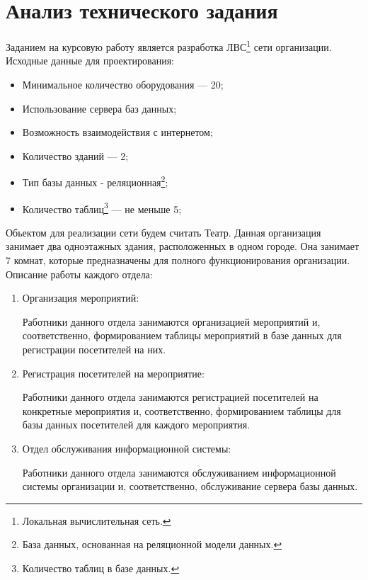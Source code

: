 \documentclass[russian,utf8,pointsection,simple,14pt]{eskdtext}
\begin{document}
\maketitle
\tableofcontents
\newpage
\section{Анализ технического задания}
Заданием на курсовую работу является разработка ЛВС\footnote{Локальная вычислительная сеть.} сети организации.
\medskip
\point Исходные данные для проектирования:
\begin{itemize}
\item Минимальное количество оборудования --- 20;
\item Использование сервера баз данных;
\item Возможность взаимодействия с интернетом;
\item Количество зданий --- 2;
\item Тип базы данных - реляционная\footnote{База данных, основанная на реляционной модели данных.};
\item Количество таблиц\footnote{Количество таблиц в базе данных.} --- не меньше 5;
\end{itemize}

Обьектом для реализации сети будем считать Театр. Данная организация занимает два одноэтажных здания, расположенных в одном городе. Она занимает 7 комнат, которые предназначены для полного функционирования организации.
\medskip 
\point Описание работы каждого отдела:
\begin{enumerate}
	\item Организация мероприятий:
	
		Работники данного отдела занимаются организацией мероприятий и, соответственно, формированием таблицы мероприятий в базе данных для регистрации посетителей на них. 

	\item Регистрация посетителей на мероприятие:

Работники данного отдела занимаются регистрацией посетителей на конкретные мероприятия и, соответственно, формированием таблицы для базы данных посетителей для каждого мероприятия.

    \item Отдел обслуживания информационной системы:
    
Работники данного отдела занимаются обслуживанием информационной системы организации и, соответственно, обслуживание сервера базы данных.

\end{enumerate}
\end{document}
